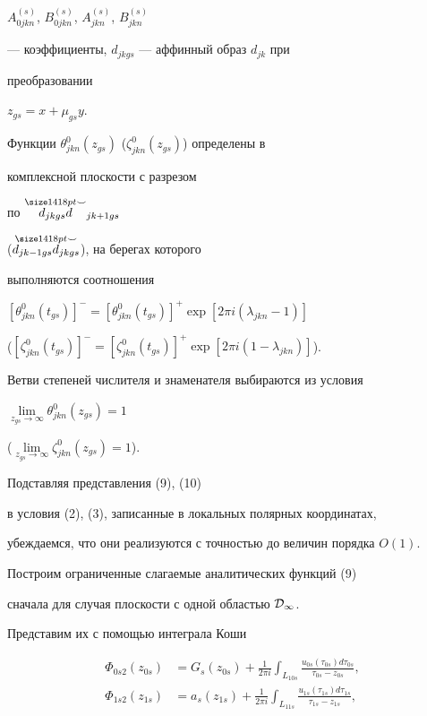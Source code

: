 $A^{(s)}_{0jkn}$, $B^{(s)}_{0jkn}$, $A^{(s)}_{jkn}$, $B^{(s)}_{jkn}$ 


--- коэффициенты, $d_{jk gs}$ --- аффинный образ $d_{jk}$ при 


преобразовании 


$z_{gs}=x+\mu_{gs}y$. 


Функции $\theta^0_{jkn}(z_{gs})$ ($\zeta^0_{jkn}(z_{gs})$) определены в 


комплексной плоскости с разрезом 


по $\overset{\Smile}{d_{jk gs}d}{}_{jk+1gs}$ 


($\overset{\Smile}{d_{jk-1gs}d_{jk gs}}{}$), на берегах которого 


выполняются соотношения 


$[\theta^0_{jkn}(t_{gs})]^-=[\theta^0_{jkn}(t_{gs})]^+ \exp[2\pi 


i(\lambda_{jkn}-1)]$ 


($[\zeta^0_{jkn}(t_{gs})]^-=[\zeta^0_{jkn}(t_{gs})]^+ \exp[2\pi 


i(1-\lambda_{jkn})]$). 


Ветви степеней числителя и знаменателя выбираются из условия 


$\lim\limits_{z_{gs}\to\infty}\theta^0_{jkn}(z_{gs})=1$ 


($\lim\limits_{z_{gs}\to\infty}\zeta^0_{jkn}(z_{gs})=1$). 


Подставляя представления (9), (10) 


в условия (2), (3), записанные в локальных полярных координатах, 


убеждаемся, что они реализуются с точностью до величин порядка $O(1)$. 


 


Построим ограниченные слагаемые аналитических функций (9) 


сначала для случая плоскости с одной областью $\cal D_1$. 


Представим их с помощью интеграла Коши 


\begin{align} 


\Phi_{0s2}(z_{0s})&=G_s(z_{0s})+\frac{1}{2\pi i} 


\int_{L_{10s}}\frac{u_{0s}(\tau_{0s})d \tau_{0s}} 


{\tau_{0s}-z_{0s}},\\ 


% 


\Phi_{1s2}(z_{1s})&=a_s(z_{1s})+\frac{1}{2\pi i} 


\int_{L_{11s}}\frac{u_{1s}(\tau_{1s})d \tau_{1s}} 


{\tau_{1s}-z_{1s}}, 


\end{align} 


